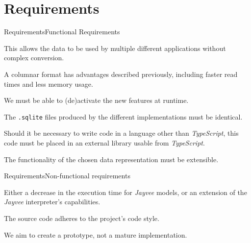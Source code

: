 \section{Requirements}
\begin{frame}[t]{Requirements}{Functional Requirements}
	\begin{description}[<+(1)->]
		\item[interoperability] This allows the data to be used by multiple different applications without complex conversion.
		\item[columnar] A columnar format has advantages described previously, including faster read times and less memory usage.
		\item[feature toggle] We must be able to (de)activate the new features at runtime.
		\item[compatibility] The \Verb|.sqlite| files produced by the different implementations must be identical.
		\item[modularization] Should it be necessary to write code in a language other than \emph{TypeScript}, this code must be placed in an external library usable from \emph{TypeScript}.
		\item[extensibility] The functionality of the chosen data representation must be extensible.
	\end{description}
\end{frame}
\begin{frame}[t]{Requirements}{Non-functional requirements}
	\begin{description}[<+(1)->]
		\item[performance] Either a decrease in the execution time for \emph{Jayvee} models, or an extension of the \emph{Jayvee} interpreter's capabilities.
		\item[code style] The source code adheres to the project's code style.
		\item[maturity] We aim to create a prototype, not a mature implementation.
	\end{description}
\end{frame}

